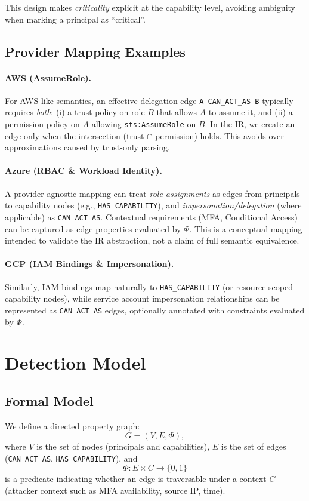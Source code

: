 \documentclass[a4paper,11pt]{article}
\begin{document}
This design makes \textit{criticality} explicit at the capability level, avoiding ambiguity when marking a principal as “critical”.

\subsection{Provider Mapping Examples}
\paragraph{AWS (AssumeRole).}
For AWS-like semantics, an effective delegation edge \texttt{A CAN\_ACT\_AS B} typically requires \textit{both}:
(i) a trust policy on role \(B\) that allows \(A\) to assume it, and
(ii) a permission policy on \(A\) allowing \texttt{sts:AssumeRole} on \(B\).
In the IR, we create an edge only when the intersection (trust $\cap$ permission) holds. This avoids over-approximations caused by trust-only parsing.

\paragraph{Azure (RBAC \& Workload Identity).}
A provider-agnostic mapping can treat \textit{role assignments} as edges from principals to capability nodes (e.g., \texttt{HAS\_CAPABILITY}), and \textit{impersonation/delegation} (where applicable) as \texttt{CAN\_ACT\_AS}. Contextual requirements (MFA, Conditional Access) can be captured as edge properties evaluated by \(\Phi\). This is a conceptual mapping intended to validate the IR abstraction, not a claim of full semantic equivalence.

\paragraph{GCP (IAM Bindings \& Impersonation).}
Similarly, IAM bindings map naturally to \texttt{HAS\_CAPABILITY} (or resource-scoped capability nodes), while service account impersonation relationships can be represented as \texttt{CAN\_ACT\_AS} edges, optionally annotated with constraints evaluated by \(\Phi\).

\section{Detection Model}

\subsection{Formal Model}
We define a directed property graph:
\[
G=(V,E,\Phi),
\]
where \(V\) is the set of nodes (principals and capabilities), \(E\) is the set of edges (\texttt{CAN\_ACT\_AS}, \texttt{HAS\_CAPABILITY}), and
\[
\Phi: E \times C \rightarrow \{0,1\}
\]
is a predicate indicating whether an edge is traversable under a context \(C\) (attacker context such as MFA availability, source IP, time).
\end{document}
